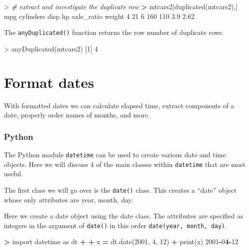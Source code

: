 \documentclass[
]{book}
\newenvironment{Shaded}{\begin{snugshade}}{\end{snugshade}}
\newcommand{\BuiltInTok}[1]{#1}
\newcommand{\CommentTok}[1]{\textcolor[rgb]{0.56,0.35,0.01}{\textit{#1}}}
\newcommand{\DecValTok}[1]{\textcolor[rgb]{0.00,0.00,0.81}{#1}}
\newcommand{\ErrorTok}[1]{\textcolor[rgb]{0.64,0.00,0.00}{\textbf{#1}}}
\newcommand{\FloatTok}[1]{\textcolor[rgb]{0.00,0.00,0.81}{#1}}
\newcommand{\FunctionTok}[1]{\textcolor[rgb]{0.00,0.00,0.00}{#1}}
\newcommand{\ImportTok}[1]{#1}
\newcommand{\NormalTok}[1]{#1}
\newcommand{\OperatorTok}[1]{\textcolor[rgb]{0.81,0.36,0.00}{\textbf{#1}}}
\newcommand{\SpecialCharTok}[1]{\textcolor[rgb]{0.00,0.00,0.00}{#1}}
\begin{document}
\begin{Shaded}
\begin{Highlighting}[]
\SpecialCharTok{\textgreater{}} \CommentTok{\# extract and investigate the duplicate row}
\ErrorTok{\textgreater{}}\NormalTok{ mtcars2[}\FunctionTok{duplicated}\NormalTok{(mtcars2),]}
\NormalTok{  mpg cylinders disp  hp axle\_ratio weight}
\DecValTok{4}  \DecValTok{21}         \DecValTok{6}  \DecValTok{160} \DecValTok{110}        \FloatTok{3.9}   \FloatTok{2.62}
\end{Highlighting}
\end{Shaded}

The \texttt{anyDuplicated()} function returns the row number of duplicate rows.

\begin{Shaded}
\begin{Highlighting}[]
\SpecialCharTok{\textgreater{}} \FunctionTok{anyDuplicated}\NormalTok{(mtcars2)}
\NormalTok{[}\DecValTok{1}\NormalTok{] }\DecValTok{4}
\end{Highlighting}
\end{Shaded}

\hypertarget{format-dates}{%
\section{Format dates}\label{format-dates}}

With formatted dates we can calculate elapsed time, extract components of a date, properly order names of months, and more.

\hypertarget{python-28}{%
\subsubsection*{Python}\label{python-28}}

The Python module \texttt{datetime} can be used to create various date and time objects. Here we will discuss 4 of the main classes within \texttt{datetime} that are most useful.

The first class we will go over is the \texttt{date()} class. This creates a ``date'' object whose only attributes are year, month, day.

Here we create a date object using the date class. The attributes are specified as integers in the argument of \texttt{date()} in this order \texttt{date(year,\ month,\ day)}.

\begin{Shaded}
\begin{Highlighting}[]
\OperatorTok{\textgreater{}} \ImportTok{import}\NormalTok{ datetime }\ImportTok{as}\NormalTok{ dt }
\OperatorTok{+} 
\OperatorTok{+}\NormalTok{ x }\OperatorTok{=}\NormalTok{ dt.date(}\DecValTok{2001}\NormalTok{, }\DecValTok{4}\NormalTok{, }\DecValTok{12}\NormalTok{)}
\OperatorTok{+} \BuiltInTok{print}\NormalTok{(x)}
\DecValTok{2001}\OperatorTok{{-}}\DecValTok{0}\ErrorTok{4}\OperatorTok{{-}}\DecValTok{12}
\end{Highlighting}
\end{Shaded}
\end{document}
